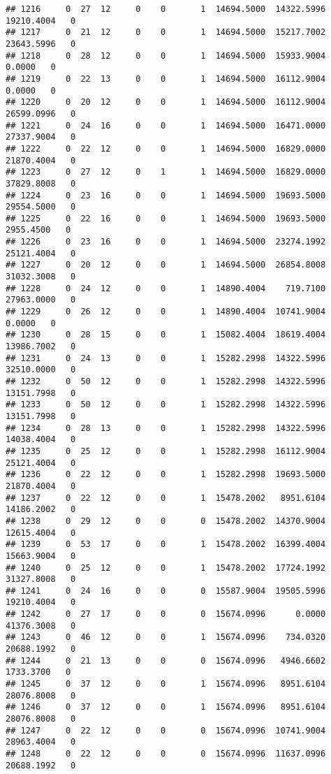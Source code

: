 \documentclass[
]{article}
\begin{document}
\begin{enumerate}
\begin{verbatim}
## 1216     0  27  12     0    0       1  14694.5000  14322.5996  19210.4004   0
## 1217     0  21  12     0    0       1  14694.5000  15217.7002  23643.5996   0
## 1218     0  28  12     0    0       1  14694.5000  15933.9004      0.0000   0
## 1219     0  22  13     0    0       1  14694.5000  16112.9004      0.0000   0
## 1220     0  20  12     0    0       1  14694.5000  16112.9004  26599.0996   0
## 1221     0  24  16     0    0       1  14694.5000  16471.0000  27337.9004   0
## 1222     0  22  12     0    0       1  14694.5000  16829.0000  21870.4004   0
## 1223     0  27  12     0    1       1  14694.5000  16829.0000  37829.8008   0
## 1224     0  23  16     0    0       1  14694.5000  19693.5000  29554.5000   0
## 1225     0  22  16     0    0       1  14694.5000  19693.5000   2955.4500   0
## 1226     0  23  16     0    0       1  14694.5000  23274.1992  25121.4004   0
## 1227     0  20  12     0    0       1  14694.5000  26854.8008  31032.3008   0
## 1228     0  24  12     0    0       1  14890.4004    719.7100  27963.0000   0
## 1229     0  26  12     0    0       1  14890.4004  10741.9004      0.0000   0
## 1230     0  28  15     0    0       1  15082.4004  18619.4004  13986.7002   0
## 1231     0  24  13     0    0       1  15282.2998  14322.5996  32510.0000   0
## 1232     0  50  12     0    0       1  15282.2998  14322.5996  13151.7998   0
## 1233     0  50  12     0    0       1  15282.2998  14322.5996  13151.7998   0
## 1234     0  28  13     0    0       1  15282.2998  14322.5996  14038.4004   0
## 1235     0  25  12     0    0       1  15282.2998  16112.9004  25121.4004   0
## 1236     0  22  12     0    0       1  15282.2998  19693.5000  21870.4004   0
## 1237     0  22  12     0    0       1  15478.2002   8951.6104  14186.2002   0
## 1238     0  29  12     0    0       0  15478.2002  14370.9004  12615.4004   0
## 1239     0  53  17     0    0       1  15478.2002  16399.4004  15663.9004   0
## 1240     0  25  12     0    0       1  15478.2002  17724.1992  31327.8008   0
## 1241     0  24  16     0    0       0  15587.9004  19505.5996  19210.4004   0
## 1242     0  27  17     0    0       0  15674.0996      0.0000  41376.3008   0
## 1243     0  46  12     0    0       1  15674.0996    734.0320  20688.1992   0
## 1244     0  21  13     0    0       0  15674.0996   4946.6602   1733.3700   0
## 1245     0  37  12     0    0       1  15674.0996   8951.6104  28076.8008   0
## 1246     0  37  12     0    0       1  15674.0996   8951.6104  28076.8008   0
## 1247     0  22  12     0    0       0  15674.0996  10741.9004  28963.4004   0
## 1248     0  22  12     0    0       0  15674.0996  11637.0996  20688.1992   0

\end{verbatim}
\end{enumerate}
\end{document}

